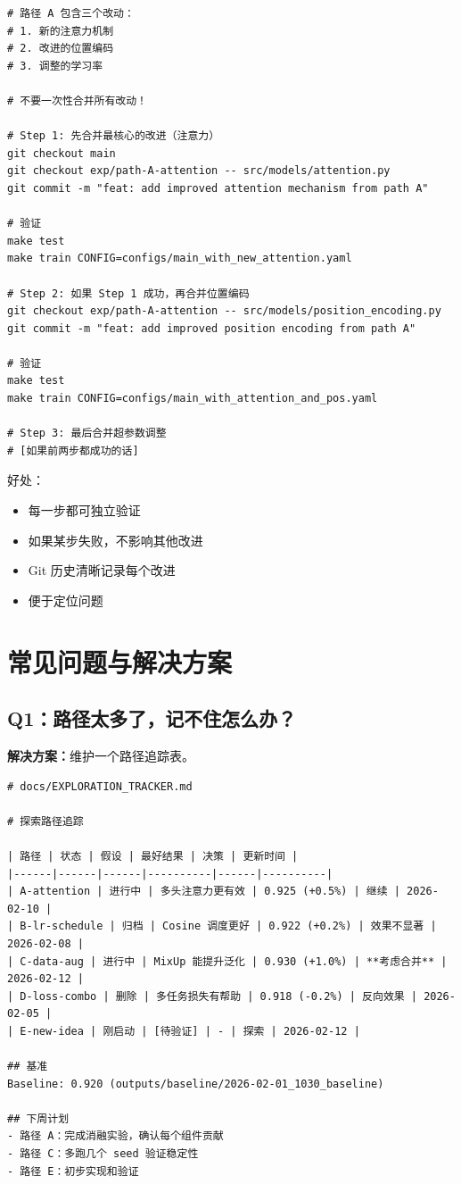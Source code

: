 \begin{verbatim}
# 路径 A 包含三个改动：
# 1. 新的注意力机制
# 2. 改进的位置编码
# 3. 调整的学习率

# 不要一次性合并所有改动！

# Step 1: 先合并最核心的改进（注意力）
git checkout main
git checkout exp/path-A-attention -- src/models/attention.py
git commit -m "feat: add improved attention mechanism from path A"

# 验证
make test
make train CONFIG=configs/main_with_new_attention.yaml

# Step 2: 如果 Step 1 成功，再合并位置编码
git checkout exp/path-A-attention -- src/models/position_encoding.py
git commit -m "feat: add improved position encoding from path A"

# 验证
make test
make train CONFIG=configs/main_with_attention_and_pos.yaml

# Step 3: 最后合并超参数调整
# [如果前两步都成功的话]
\end{verbatim}

好处：
\begin{itemize}
  \item 每一步都可独立验证
  \item 如果某步失败，不影响其他改进
  \item Git 历史清晰记录每个改进
  \item 便于定位问题
\end{itemize}

\section{常见问题与解决方案}

\subsection{Q1：路径太多了，记不住怎么办？}

\textbf{解决方案：}维护一个路径追踪表。

\begin{verbatim}
# docs/EXPLORATION_TRACKER.md

# 探索路径追踪

| 路径 | 状态 | 假设 | 最好结果 | 决策 | 更新时间 |
|------|------|------|----------|------|----------|
| A-attention | 进行中 | 多头注意力更有效 | 0.925 (+0.5%) | 继续 | 2026-02-10 |
| B-lr-schedule | 归档 | Cosine 调度更好 | 0.922 (+0.2%) | 效果不显著 | 2026-02-08 |
| C-data-aug | 进行中 | MixUp 能提升泛化 | 0.930 (+1.0%) | **考虑合并** | 2026-02-12 |
| D-loss-combo | 删除 | 多任务损失有帮助 | 0.918 (-0.2%) | 反向效果 | 2026-02-05 |
| E-new-idea | 刚启动 | [待验证] | - | 探索 | 2026-02-12 |

## 基准
Baseline: 0.920 (outputs/baseline/2026-02-01_1030_baseline)

## 下周计划
- 路径 A：完成消融实验，确认每个组件贡献
- 路径 C：多跑几个 seed 验证稳定性
- 路径 E：初步实现和验证
\end{verbatim}

